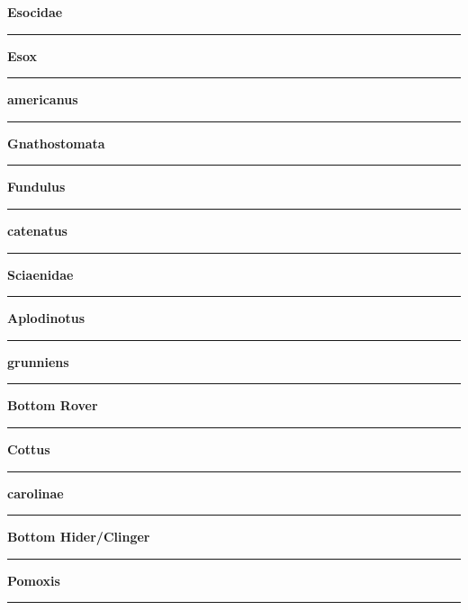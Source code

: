 \documentclass[11pt]{exam}
\newcommand*\Matching[1]{
\ifprintanswers
	\textbf{#1}
\else
	\rule{2.1in}{0.4pt}
\fi
}
\newlength\matchlena
\newlength\matchlenb
\newcommand\MatchQuestion[2]{%
	\setlength\matchlenb{\linewidth}
	\addtolength\matchlenb{-\matchlena}
	\parbox[t]{\matchlena}{\Matching{#1}}\enspace\parbox[t]{\matchlenb}{#2}}
\begin{document}
\begin{questions}


\vspace{1\baselineskip}

\begin{multicols}{2}
\question\MatchQuestion{Esocidae}{}
\vspace{1.5\baselineskip}

\question\MatchQuestion{Esox}{}
\vspace{1.5\baselineskip}

\question\MatchQuestion{americanus}{}
\vspace{1.5\baselineskip}

\question\MatchQuestion{Gnathostomata}{}
\vspace{1.5\baselineskip}

\question\MatchQuestion{Fundulus}{}
\vspace{1.5\baselineskip}

\question\MatchQuestion{catenatus}{}
\vspace{1.5\baselineskip}

\question\MatchQuestion{Sciaenidae}{}
\vspace{1.5\baselineskip}

\question\MatchQuestion{Aplodinotus}{}
\vspace{1.5\baselineskip}

\question\MatchQuestion{grunniens}{}
\vspace{1.5\baselineskip}

\question\MatchQuestion{Bottom Rover}{}
\vspace{1.5\baselineskip}

\question\MatchQuestion{Cottus}{}
\vspace{1.5\baselineskip}

\question\MatchQuestion{carolinae}{}
\vspace{1.5\baselineskip}

\question\MatchQuestion{Bottom Hider/Clinger}{}
\vspace{1.5\baselineskip}

\question\MatchQuestion{Pomoxis}{}
\vspace{1.5\baselineskip}


\end{multicols}
\end{questions}
\end{document}
